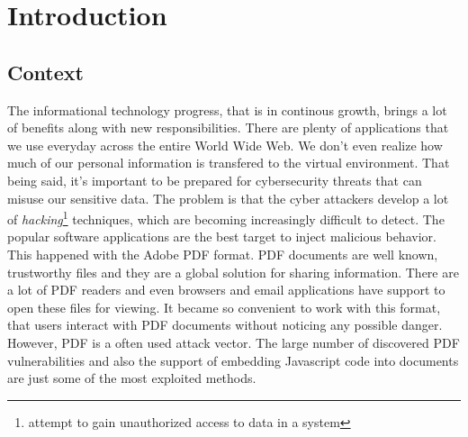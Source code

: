 \chapter{Introduction}
\label{chapter:introduction}

\section{Context}
\label{section:context} 
The informational technology progress, that is in continous growth, brings a lot of benefits along with new responsibilities. There are plenty of applications that we use everyday across the entire World Wide Web. We don't even realize how much of our personal information is transfered to the virtual environment. That being said, it's important to be prepared for cybersecurity threats that can misuse our sensitive data. The problem is that the cyber attackers develop a lot of \textit{hacking}\footnote{attempt to gain unauthorized access to data in a system} techniques, which are becoming increasingly difficult to detect. The popular software applications are the best target to inject malicious behavior. This happened with the Adobe PDF format. PDF documents are well known, trustworthy files and they are a global solution for sharing information. There are a lot of PDF readers and even browsers and email applications have support to open these files for viewing. It became so convenient to work with this format, that users interact with PDF documents without noticing any possible danger. However, PDF is a often used attack vector. The large number of discovered PDF vulnerabilities and also the support of embedding Javascript code into documents are just some of the most exploited methods.


